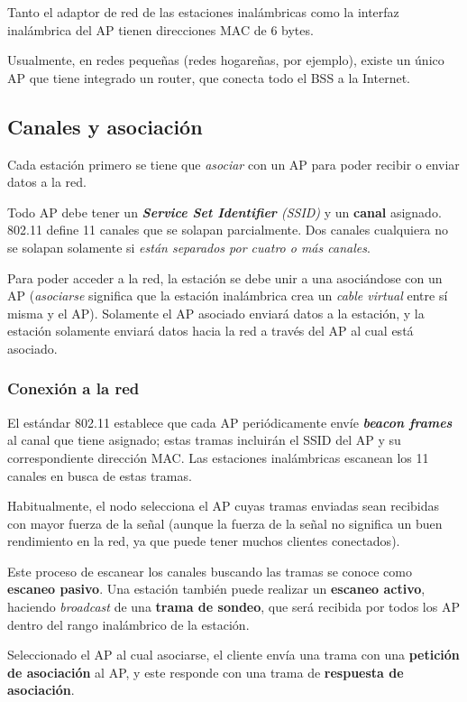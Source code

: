 Tanto el adaptor de red de las estaciones inalámbricas como la interfaz inalámbrica del AP tienen direcciones MAC de 6 bytes.

Usualmente, en redes pequeñas (redes hogareñas, por ejemplo), existe un único AP que tiene integrado un router, que conecta todo el BSS a la Internet.

\subsection{Canales y asociación}

Cada estación primero se tiene que \emph{asociar} con un AP para poder recibir o enviar datos a la red. 

Todo AP debe tener un \emph{\textbf{Service Set Identifier} (SSID)} y un \textbf{canal} asignado. 802.11 define 11 canales que se solapan parcialmente. Dos canales cualquiera no se solapan solamente si \emph{están separados por cuatro o más canales}. 

Para poder acceder a la red, la estación se debe unir a una asociándose con un AP (\emph{asociarse} significa que la estación inalámbrica crea un \emph{cable virtual} entre sí misma y el AP). Solamente el AP asociado enviará datos a la estación, y la estación solamente enviará datos hacia la red a través del AP al cual está asociado.

\subsubsection{Conexión a la red}

El estándar 802.11 establece que cada AP periódicamente envíe \emph{\textbf{beacon frames}} al canal que tiene asignado; estas tramas incluirán el SSID del AP y su correspondiente dirección MAC. Las estaciones inalámbricas escanean los 11 canales en busca de estas tramas.

Habitualmente, el nodo selecciona el AP cuyas tramas enviadas sean recibidas con mayor fuerza de la señal (aunque la fuerza de la señal no significa un buen rendimiento en la red, ya que puede tener muchos clientes conectados).

Este proceso de escanear los canales buscando las tramas se conoce como \textbf{escaneo pasivo}. Una estación también puede realizar un \textbf{escaneo activo}, haciendo \emph{broadcast} de una \textbf{trama de sondeo}, que será recibida por todos los AP dentro del rango inalámbrico de la estación.    

Seleccionado el AP al cual asociarse, el cliente envía una trama con una \textbf{petición de asociación} al AP, y este responde con una trama de \textbf{respuesta de asociación}.

